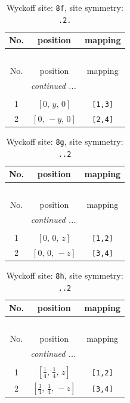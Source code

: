 \documentclass[fleqn,8pt]{jsarticle}
\begin{document}
\renewcommand{\arraystretch}{1.2}
\begin{longtable}{ccc}
\caption{Wyckoff site: {\tt 8f}, site symmetry: {\tt .2.}}
 \\
 \hline \hline
No. & position & mapping \\ \hline \endfirsthead

\multicolumn{2}{l}{\tablename\ \thetable{}} \\
 \hline \hline
No. & position & mapping \\ \hline \endhead

 \hline \hline
\multicolumn{2}{r}{\footnotesize\it continued ...} \\ \endfoot

 \hline \hline
\multicolumn{2}{r}{} \\ \endlastfoot

1 & $\left[ 0,\, y,\, 0 \right]$ & {\tt [1,3]} \\ \hline
2 & $\left[ 0,\, - y,\, 0 \right]$ & {\tt [2,4]} \\
\end{longtable}
\renewcommand{\arraystretch}{1.2}
\begin{longtable}{ccc}
\caption{Wyckoff site: {\tt 8g}, site symmetry: {\tt ..2}}
 \\
 \hline \hline
No. & position & mapping \\ \hline \endfirsthead

\multicolumn{2}{l}{\tablename\ \thetable{}} \\
 \hline \hline
No. & position & mapping \\ \hline \endhead

 \hline \hline
\multicolumn{2}{r}{\footnotesize\it continued ...} \\ \endfoot

 \hline \hline
\multicolumn{2}{r}{} \\ \endlastfoot

1 & $\left[ 0,\, 0,\, z \right]$ & {\tt [1,2]} \\ \hline
2 & $\left[ 0,\, 0,\, - z \right]$ & {\tt [3,4]} \\
\end{longtable}
\renewcommand{\arraystretch}{1.2}
\begin{longtable}{ccc}
\caption{Wyckoff site: {\tt 8h}, site symmetry: {\tt ..2}}
 \\
 \hline \hline
No. & position & mapping \\ \hline \endfirsthead

\multicolumn{2}{l}{\tablename\ \thetable{}} \\
 \hline \hline
No. & position & mapping \\ \hline \endhead

 \hline \hline
\multicolumn{2}{r}{\footnotesize\it continued ...} \\ \endfoot

 \hline \hline
\multicolumn{2}{r}{} \\ \endlastfoot

1 & $\left[ \frac{1}{4},\, \frac{1}{4},\, z \right]$ & {\tt [1,2]} \\ \hline
2 & $\left[ \frac{3}{4},\, \frac{1}{4},\, - z \right]$ & {\tt [3,4]} \\
\end{longtable}
\end{document}
